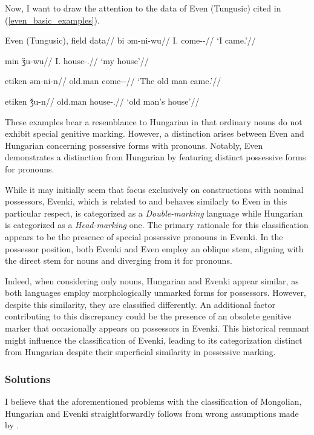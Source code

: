 Now, I want to draw the attention to the data of Even (Tungusic) cited in (\ref{even_basic_examples}).

\pex\label{even_basic_examples}
\glpreamble Even (Tungusic), field data//
\a
\begingl
\gla bi əm-ni-wu//
\glb I.\Nom{} come-\Pst-\Fsg//
\glft `I came.'//
\endgl

\a
\begingl
\gla min ǯu-wu//
\glb I.\Obl{} house-\Poss.\Fsg//
\glft `my house'//
\endgl

\a
\begingl
\gla etiken əm-ni-n//
\glb old.man come-\Pst-\Tsg//
\glft `The old man came.'//
\endgl

\a
\begingl
\gla etiken ǯu-n//
\glb old.man house-\Poss.\Tsg//
\glft `old man's house'//
\endgl
\xe

These examples bear a resemblance to Hungarian in that ordinary nouns do not exhibit special genitive marking. However, a distinction arises between Even and Hungarian concerning possessive forms with pronouns. Notably, Even demonstrates a distinction from Hungarian by featuring distinct possessive forms for pronouns.

While it may initially seem that \cite{nichols_locus_2013} focus exclusively  on constructions with nominal possessors, Evenki, which is related to and behaves similarly to Even in this particular respect, is categorized as a \textit{Double-marking} language while Hungarian is categorized as a \textit{Head-marking} one. The primary rationale for this classification appears to be the presence of special possessive pronouns in Evenki. In the possessor position, both Evenki and Even employ an oblique stem, aligning with the direct stem for nouns and diverging from it for pronouns.

Indeed, when considering only nouns, Hungarian and Evenki appear similar, as both languages employ morphologically unmarked forms for possessors. However, despite this similarity, they are classified differently. An additional factor contributing to this discrepancy could be the presence of an obsolete genitive marker that occasionally appears on possessors in Evenki. This historical remnant might influence the classification of Evenki, leading to its categorization distinct from Hungarian despite their superficial similarity in possessive marking.

\subsubsection{Solutions}

I believe that the aforementioned problems with the classification of Mongolian, Hungarian and Evenki straightforwardly follows from wrong assumptions made by \cite{nichols_locus_2013}.

